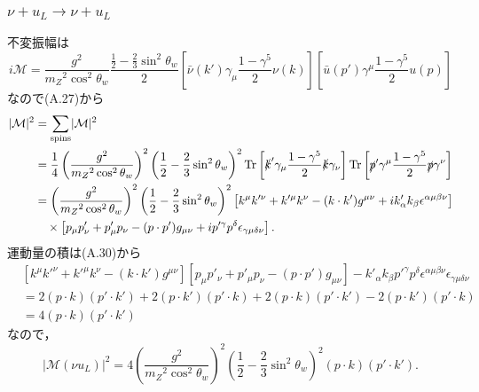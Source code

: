 \subsubsection{\(\nu + u_L \to \nu + u_L\)}
不変振幅は
\[
i\mathcal{M} = \frac{g^2}{m_Z{}^2\cos^2\theta_w} \frac{\frac{1}{2} - \frac{2}{3}\sin^2\theta_w}{2}
\left[\bar\nu(k') \gamma_\mu \frac{1-\gamma^5}{2} \nu(k) \right]
\left[\bar{u}(p') \gamma^\mu \frac{1-\gamma^5}{2} u(p) \right]
\]
なので(A.27)から
\begin{align*}
  \lvert\mathcal{M}\rvert^2
  &= \sum_\text{spins} \lvert\mathcal{M}\rvert^2 \\
  &= \frac{1}{4} \left(\frac{g^2}{m_Z{}^2\cos^2\theta_w}\right)^2
  \left(\frac{1}{2} - \frac{2}{3}\sin^2\theta_w\right)^2
  \operatorname{Tr} \left[ \slashed{k}' \gamma_\mu \frac{1-\gamma^5}{2} \slashed{k} \gamma_\nu \right]
  \operatorname{Tr} \left[ \slashed{p}' \gamma^\mu \frac{1-\gamma^5}{2} \slashed{p} \gamma^\nu \right] \\
  &= \left(\frac{g^2}{m_Z{}^2\cos^2\theta_w}\right)^2
  \left(\frac{1}{2} - \frac{2}{3}\sin^2\theta_w\right)^2
  \left[ k^\mu k'^\nu + k'^\mu k^\nu - (k\cdot k') g^{\mu\nu} + ik'_\alpha k_\beta \epsilon^{\alpha\mu\beta\nu} \right] \\
  &\quad\times \left[ p_\mu p'_\nu + p'_\mu p_\nu - (p\cdot p') g_{\mu\nu} + ip'^\gamma p^\delta \epsilon_{\gamma\mu\delta\nu} \right] .
\end{align*}
運動量の積は(A.30)から
\begin{align*}
  & [k^\mu k'^\nu + k'^\mu k^\nu - (k\cdot k') g^{\mu\nu}]
  [p_\mu p'_\nu + p'_\mu p_\nu - (p\cdot p') g_{\mu\nu}]
  - k'_\alpha k_\beta p'^\gamma p^\delta \epsilon^{\alpha\mu\beta\nu}\epsilon_{\gamma\mu\delta\nu} \\
  &= 2 (p\cdot k)(p'\cdot k') + 2 (p\cdot k')(p'\cdot k) + 2 (p\cdot k)(p'\cdot k') - 2 (p\cdot k')(p'\cdot k) \\
  &= 4 (p\cdot k)(p'\cdot k')
\end{align*}
なので，
\[
\lvert\mathcal{M}(\nu u_L)\rvert^2
= 4 \left(\frac{g^2}{m_Z{}^2\cos^2\theta_w}\right)^2
\left(\frac{1}{2} - \frac{2}{3}\sin^2\theta_w\right)^2
(p\cdot k)(p'\cdot k') .
\]

